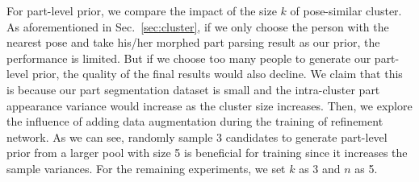 \documentclass[10pt,twocolumn,letterpaper]{article}
\begin{document}
For part-level prior, we compare the impact of the size $k$ of pose-similar cluster. As aforementioned in Sec.~\ref{sec:cluster}, if we only choose the person with the nearest pose and take his/her morphed part parsing result as our prior, the performance is limited. But if we choose too many people to generate our part-level prior, the quality of the final results would also decline. We claim that this is because our part segmentation dataset is small and the intra-cluster part appearance variance would increase as the cluster size increases. Then, we explore the influence of adding data augmentation during the training of refinement network. As we can see, randomly sample 3 candidates to generate part-level prior from a larger pool with size 5 is beneficial for training since it increases the sample variances. For the remaining experiments, we set $k$ as 3 and $n$ as 5.
\vspace{-3mm}
\end{document}
